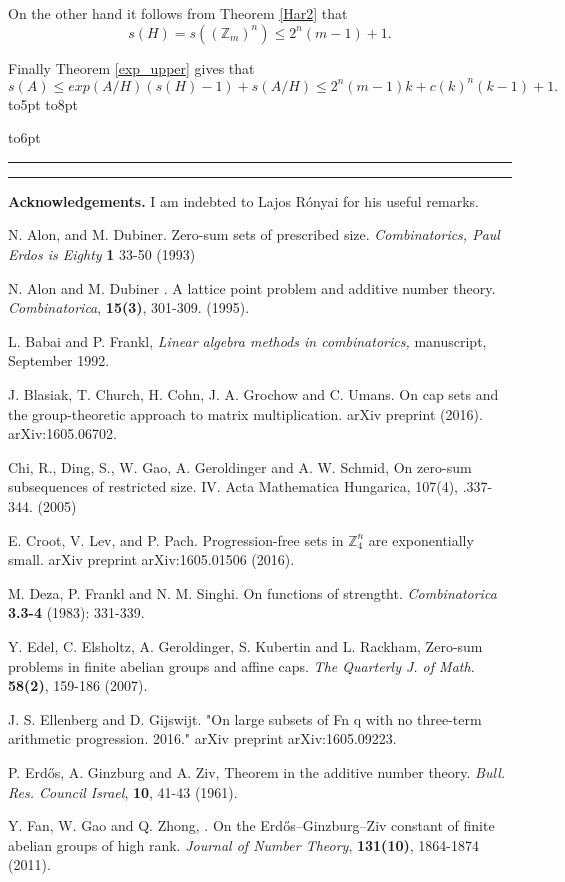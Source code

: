 \documentclass[12pt]{article}
\newcommand{\openbox}{\leavevmode
  \hbox to8pt{\hfil\vrule\vbox to6pt{\hrule width6pt\vfil\hrule}\vrule}}
\newcommand{\qed}{\hbox to5pt{ } \hfill \openbox\bigskip\medskip}
\newcommand{\Z}{\mathbb Z}
\begin{document}
On the other hand it follows from Theorem \ref{Har2} that
$$
s(H)=s(({\Z}_{m})^n) \leq 2^n(m-1)+1.
$$

Finally Theorem \ref{exp_upper} gives that
$$
s(A)\leq exp(A/H)(s(H)-1)+s(A/H)\leq 2^n(m-1)k + c(k)^n(k-1)+1.
$$
\qed



{\bf Acknowledgements.} 
I am indebted to  Lajos R\'onyai for his useful remarks. 

\begin{thebibliography}{MM}

 N. Alon,  and  M. Dubiner. Zero-sum sets of prescribed size. {\em Combinatorics, Paul Erdos is Eighty} {\bf 1}  33-50 (1993)

 N. Alon and M. Dubiner . A lattice point problem and additive number theory. {\em Combinatorica}, {\bf 15(3)},  301-309. (1995).

 L. Babai and P. Frankl, {\em Linear algebra methods in
combinatorics,} manuscript, September 1992.

 J. Blasiak, T. Church, H. Cohn, J. A. Grochow and C.  Umans.  On cap sets and the group-theoretic approach to matrix multiplication. arXiv preprint (2016). arXiv:1605.06702.

 Chi, R., Ding, S., W. Gao, A. Geroldinger and A. W. Schmid,   On zero-sum subsequences of restricted size. IV. Acta Mathematica Hungarica, 107(4), .337-344. (2005)

 E. Croot,  V. Lev, and P. Pach. Progression-free sets in ${\Z}_4^ n$ are exponentially small. arXiv preprint arXiv:1605.01506 (2016).

 M. Deza, P. Frankl and N. M. Singhi. On functions of strengtht. {\em  Combinatorica} {\bf 3.3-4} (1983): 331-339.

 Y. Edel, C. Elsholtz, A. Geroldinger, S. Kubertin and L. Rackham,  Zero-sum problems in finite abelian groups and affine caps. {\em The Quarterly J. of Math.} {\bf  58(2)}, 159-186 (2007).

 J. S. Ellenberg and D. Gijswijt. "On large subsets of Fn q with no three-term arithmetic progression. 2016." arXiv preprint arXiv:1605.09223.

 P. Erd\H{o}s, A. Ginzburg and A. Ziv,  Theorem in the additive number theory. {\em Bull. Res. Council Israel}, {\bf 10}, 41-43  (1961).

 Y. Fan, W. Gao and Q. Zhong,  . On the Erdős–Ginzburg–Ziv constant of finite abelian groups of high rank. {\em Journal of Number Theory}, {\bf 131(10)}, 1864-1874 (2011).


\end{thebibliography}
\end{document}
